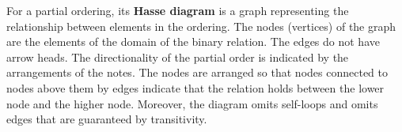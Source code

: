 
For a partial ordering, its {\bf Hasse diagram} is a graph representing the 
relationship between elements in the ordering. The nodes (vertices) of the graph 
are the elements of the 
domain of the binary relation. The edges do not have arrow heads. The
directionality of the partial order is indicated by 
the arrangements of the notes. The nodes are arranged so that nodes connected to nodes
above them by edges indicate that the relation holds between the 
lower node and the higher node. 
Moreover, the diagram omits self-loops and 
omits edges that are guaranteed by transitivity.
